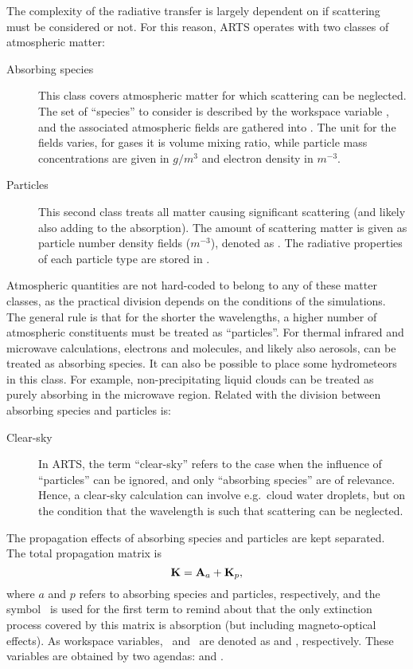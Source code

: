 The complexity of the radiative transfer is largely dependent on if scattering
must be considered or not. For this reason, ARTS operates with two classes of
atmospheric matter:
\begin{description}
\item[Absorbing species] This class covers atmospheric matter for which
  scattering can be neglected. The set of ``species'' to consider is described
  by the workspace variable , and the associated
  atmospheric fields are gathered into . The unit
  for the fields varies, for gases it is volume mixing ratio, while
  particle mass concentrations are given in $g/m^3$ and electron density in
  $m^{-3}$.
\item[Particles] This second class treats all matter causing significant
  scattering (and likely also adding to the absorption). The amount of
  scattering matter is given as particle number density fields ($m^{-3}$),
  denoted as . The radiative properties of each particle
  type are stored in .
\end{description}
Atmospheric quantities are not hard-coded to belong to any of these matter
classes, as the practical division depends on the conditions of the
simulations. The general rule is that for the shorter the wavelengths, a higher
number of atmospheric constituents must be treated as ``particles''. For
thermal infrared and microwave calculations, electrons and molecules, and
likely also aerosols, can be treated as absorbing species. It can also be
possible to place some hydrometeors in this class. For example,
non-precipitating liquid clouds can be treated as purely absorbing in the
microwave region.
Related with the division between absorbing species and particles is:
\begin{description}
\item[Clear-sky] In ARTS, the term ``clear-sky'' refers to the case when the
  influence of ``particles'' can be ignored, and only ``absorbing species'' are
  of relevance. Hence, a clear-sky calculation can involve e.g.\ cloud water
  droplets, but on the condition that the wavelength is such that scattering
  can be neglected.
\end{description}
The propagation effects of absorbing species and particles are kept separated.
The total propagation matrix is
\begin{equation}
  \label{eq:propmattotal}
  {\bf K} = {\bf A}_{a} + {\bf K}_{p}, 
\end{equation}
where $a$ and $p$ refers to absorbing species and particles, respectively, and
the symbol \AbsMat\ is used for the first term to remind about that the only
extinction process covered by this matrix is absorption (but including
magneto-optical effects). As workspace variables, \ and \
are denoted as  and ,
respectively. These variables are obtained by two agendas:
 and .



